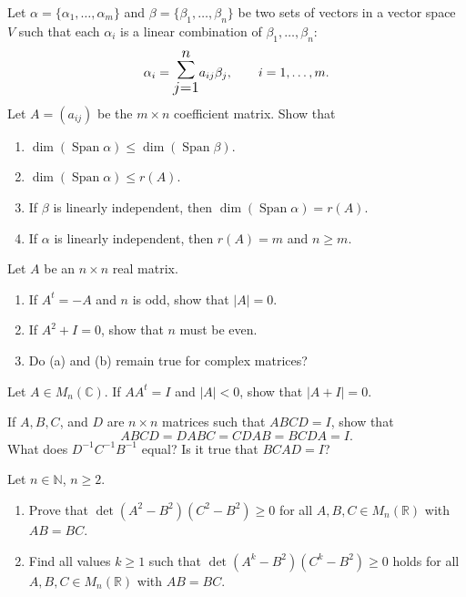 \documentclass[12pt]{article}
\let\oldsum\sum
\renewcommand{\sum}{\mathlarger{\mathlarger{\oldsum}}}
\begin{document}
\begin{problem}
Let $\alpha=\{\alpha_1,\dots,\alpha_m\}$ and $\beta=\{\beta_1,\dots,\beta_n\}$ be two sets of vectors in a vector space $V$ such that each $\alpha_i$ is a linear combination of $\beta_1,\dots,\beta_n$:
\[
\alpha_i = \sum_{j=1}^n a_{ij}\beta_j, \qquad i=1,\dots,m.
\]
Let $A=(a_{ij})$ be the $m\times n$ coefficient matrix. Show that
\begin{enumerate}[label=(\alph*)]
\item $\dim(\operatorname{Span}\alpha) \le \dim(\operatorname{Span}\beta)$.
\item $\dim(\operatorname{Span}\alpha) \le r(A)$.
\item If $\beta$ is linearly independent, then $\dim(\operatorname{Span}\alpha)=r(A)$.
\item If $\alpha$ is linearly independent, then $r(A)=m$ and $n\ge m$.
\end{enumerate}
\end{problem}

\begin{problem}
Let $A$ be an $n\times n$ real matrix.
\begin{enumerate}[label=(\alph*)]
\item If $A^t=-A$ and $n$ is odd, show that $|A|=0$.
\item If $A^2+I=0$, show that $n$ must be even.
\item Do (a) and (b) remain true for complex matrices?
\end{enumerate}
\end{problem}

\begin{problem}
Let $A\in M_n(\mathbb{C})$. If $AA^t=I$ and $|A|<0$, show that $|A+I|=0$.
\end{problem}

\begin{problem}
If $A,B,C$, and $D$ are $n\times n$ matrices such that $ABCD=I$, show that
\[
ABCD = DABC = CDAB = BCDA = I.
\]
What does $D^{-1}C^{-1}B^{-1}$ equal? Is it true that $BCAD=I$?
\end{problem}

\begin{problem}
Let $n\in\mathbb{N}$, $n\ge 2$.
\begin{enumerate}[label=(\alph*)]
\item Prove that $\det(A^2-B^2)(C^2-B^2)\ge 0$ for all $A,B,C\in M_n(\mathbb{R})$ with $AB=BC$.
\item Find all values $k\ge 1$ such that $\det(A^k-B^2)(C^k-B^2)\ge 0$ holds for all $A,B,C\in M_n(\mathbb{R})$ with $AB=BC$.
\end{enumerate}
\end{problem}
\end{document}
